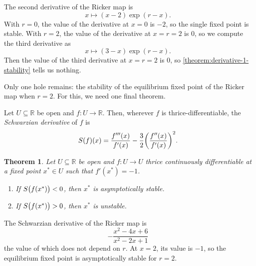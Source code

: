 \documentclass{article}
\newcommand{\reals}{\mathbb{R}}
\theoremstyle{plain}
\newtheorem{theorem}{Theorem}
\theoremstyle{definition}
\DeclarePairedDelimiter{\parensproto}{\lparen}{\rparen}
\newcommand{\parens}{\parensproto*}
\newcommand{\schwarzian}[1]{S\parens{#1}}
\begin{document}
\begin{example}
  The second derivative of the Ricker map is
  \[
    x \mapsto (x - 2)\exp(r - x).
  \]
  With \(r = 0\), the value of the derivative at \(x = 0\) is \(-2\), so the single fixed point is stable. With \(r = 2\), the value of the derivative at \(x = r = 2\) is \(0\), so we compute the third derivative as
  \[
    x \mapsto (3 - x)\exp(r - x).
  \]
  Then the value of the third derivative at \(x = r = 2\) is \(0\), so \cref{theorem:derivative-1-stability} tells us nothing.
\end{example}

Only one hole remains: the stability of the equilibrium fixed point of the Ricker map when \(r = 2\). For this, we need one final theorem.

\begin{definition}
  Let \(U \subseteq \reals\) be open and \(f : U \to \reals\). Then, wherever \(f\) is thrice-differentiable, the \emph{Schwarzian derivative} of \(f\) is
  \[
    \schwarzian{f}(x) = \frac{f'''(x)}{f'(x)} - \frac{3}{2}\parens{\frac{f''(x)}{f'(x)}}^2.
  \]
\end{definition}

\begin{theorem}
  Let \(U \subseteq \reals\) be open and \(f : U \to U\) thrice continuously differentiable at a fixed point \(x^* \in U\) such that \(f'(x^*) = -1\).
  \begin{enumerate}
  \item If \(\schwarzian{f(x^*)} < 0\), then \(x^*\) is asymptotically stable.
  \item If \(\schwarzian{f(x^*)} > 0\), then \(x^*\) is unstable.
  \end{enumerate}
\end{theorem}

\begin{example}
  The Schwarzian derivative of the Ricker map is
  \[
    -\frac{x^2 - 4x + 6}{x^2 - 2x + 1}
  \]
  the value of which does not depend on \(r\). At \(x = 2\), its value is \(-1\), so the equilibrium fixed point is asymptotically stable for \(r = 2\).
\end{example}
\end{document}

